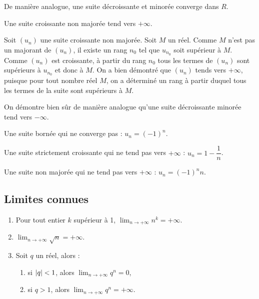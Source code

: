 \documentclass[a4paper,11pt,DIV14,BCOR0mm]{scrartcl}
\begin{document}
De manière analogue, une suite décroissante et minorée converge dans $R$.
\begin{theoreme}
 Une suite croissante non majorée tend vers $+\infty$.
\end{theoreme}
\begin{demonstration}[à connaître]
 Soit $(u_n)$ une suite croissante non majorée. Soit $M$ un réel. Comme $M$ n'est pas un majorant
de $(u_n)$, il existe un rang $n_0$ tel que $u_{n_0}$ soit supérieur à $M$. 
Comme $(u_n)$ est croissante, à partir du rang $n_0$ tous les termes de
$(u_n)$ sont supérieurs à $u_{n_0}$ et donc à $M$. On a bien démontré que $(u_n)$ tends vers 
$+\infty$, puisque pour tout nombre réel $M$, on a déterminé un rang à partir duquel tous les termes de
la suite sont supérieurs à $M$.
\end{demonstration}
On démontre bien sûr de manière analogue qu'une suite décroissante minorée tend vers $-\infty$.
\begin{exemple}
 Une suite bornée qui ne converge pas : $u_n=(-1)^n$.
\end{exemple}
\begin{exemple}
 Une suite strictement croissante qui ne tend pas vers $+\infty$ : $u_n=1-\dfrac1n$.
\end{exemple}
\begin{exemple}
 Une suite non majorée qui ne tend pas vers $+\infty$ : $u_n=(-1)^nn$.
\end{exemple}

\subsection{Limites connues}
\begin{theoreme}
 \begin{enumerate}
  \item Pour tout entier $k$ supérieur à 1, $\displaystyle\lim_{n\to+\infty}n^k=+\infty$.
  \item $\displaystyle\lim_{n\to+\infty}\sqrt{n}=+\infty$.
  \item Soit $q$ un réel, alors :
      \begin{enumerate}
	\item si $\left\lvert q\right\rvert<1$, alors $\displaystyle\lim_{n\to+\infty}q^n=0$,
	\item si $q>1$, alors $\displaystyle\lim_{n\to+\infty}q^n=+\infty$.
      \end{enumerate}
 \end{enumerate}
\end{theoreme}
\end{document}
